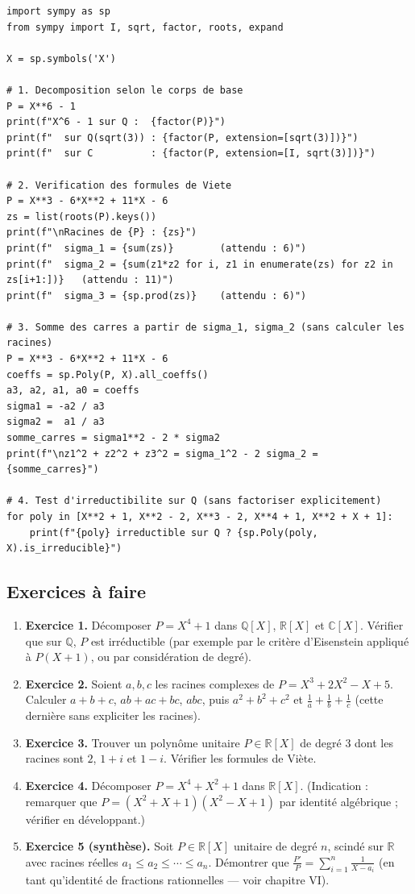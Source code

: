 \begin{lstlisting}
import sympy as sp
from sympy import I, sqrt, factor, roots, expand

X = sp.symbols('X')

# 1. Decomposition selon le corps de base
P = X**6 - 1
print(f"X^6 - 1 sur Q :  {factor(P)}")
print(f"  sur Q(sqrt(3)) : {factor(P, extension=[sqrt(3)])}")
print(f"  sur C          : {factor(P, extension=[I, sqrt(3)])}")

# 2. Verification des formules de Viete
P = X**3 - 6*X**2 + 11*X - 6
zs = list(roots(P).keys())
print(f"\nRacines de {P} : {zs}")
print(f"  sigma_1 = {sum(zs)}        (attendu : 6)")
print(f"  sigma_2 = {sum(z1*z2 for i, z1 in enumerate(zs) for z2 in zs[i+1:])}   (attendu : 11)")
print(f"  sigma_3 = {sp.prod(zs)}    (attendu : 6)")

# 3. Somme des carres a partir de sigma_1, sigma_2 (sans calculer les racines)
P = X**3 - 6*X**2 + 11*X - 6
coeffs = sp.Poly(P, X).all_coeffs()
a3, a2, a1, a0 = coeffs
sigma1 = -a2 / a3
sigma2 =  a1 / a3
somme_carres = sigma1**2 - 2 * sigma2
print(f"\nz1^2 + z2^2 + z3^2 = sigma_1^2 - 2 sigma_2 = {somme_carres}")

# 4. Test d'irreductibilite sur Q (sans factoriser explicitement)
for poly in [X**2 + 1, X**2 - 2, X**3 - 2, X**4 + 1, X**2 + X + 1]:
    print(f"{poly} irreductible sur Q ? {sp.Poly(poly, X).is_irreducible}")
\end{lstlisting}

\subsection{Exercices à faire}
\begin{enumerate}
    \item \textbf{Exercice 1.} Décomposer $P = X^4 + 1$ dans $\mathbb{Q}[X]$, $\mathbb{R}[X]$ et $\mathbb{C}[X]$. Vérifier que sur $\mathbb{Q}$, $P$ est irréductible (par exemple par le critère d'Eisenstein appliqué à $P(X+1)$, ou par considération de degré).
    \item \textbf{Exercice 2.} Soient $a, b, c$ les racines complexes de $P = X^3 + 2X^2 - X + 5$. Calculer $a + b + c$, $ab + ac + bc$, $abc$, puis $a^2 + b^2 + c^2$ et $\frac{1}{a} + \frac{1}{b} + \frac{1}{c}$ (cette dernière sans expliciter les racines).
    \item \textbf{Exercice 3.} Trouver un polynôme unitaire $P \in \mathbb{R}[X]$ de degré $3$ dont les racines sont $2$, $1 + i$ et $1 - i$. Vérifier les formules de Viète.
    \item \textbf{Exercice 4.} Décomposer $P = X^4 + X^2 + 1$ dans $\mathbb{R}[X]$. (Indication : remarquer que $P = (X^2 + X + 1)(X^2 - X + 1)$ par identité algébrique ; vérifier en développant.)
    \item \textbf{Exercice 5 (synthèse).} Soit $P \in \mathbb{R}[X]$ unitaire de degré $n$, scindé sur $\mathbb{R}$ avec racines réelles $a_1 \le a_2 \le \cdots \le a_n$. Démontrer que $\frac{P'}{P} = \sum_{i=1}^{n} \frac{1}{X - a_i}$ (en tant qu'identité de fractions rationnelles --- voir chapitre VI).
\end{enumerate}

